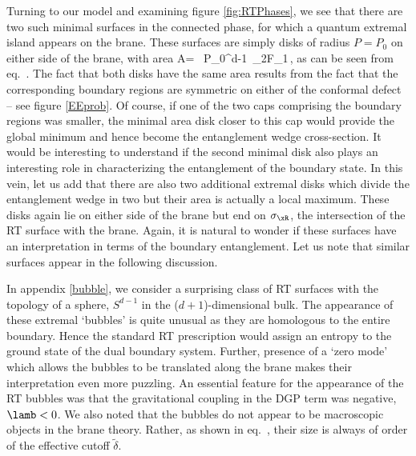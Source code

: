 Turning to our model and examining figure \ref{fig:RTPhases}, we see that there are two such minimal surfaces in the connected phase, for which a quantum extremal island appears on the brane. These surfaces are simply disks of radius $P=P_0$ on either side of the brane, with area
\beq\label{reflw}
A= \ P_0^{d-1}\, {}_{2}F_1\,,
\eeq
as can be seen from eq.~. The fact that both disks have the same area results from the fact that the corresponding boundary regions are symmetric on either of the conformal defect -- see figure \ref{EEprob}. Of course, if one of the two caps comprising the boundary regions was smaller, the minimal area disk closer to this cap would provide the global minimum and hence become the entanglement wedge cross-section. It would be interesting to understand if the second minimal disk also plays an interesting role in characterizing the entanglement of the boundary state. In this vein, let us add that there are also two additional extremal disks which divide the entanglement wedge in two but their area is actually a local maximum. These disks again lie on either side of the brane but end on $\sigma_\xR$, the intersection of the RT surface with the brane. Again, it is natural to wonder if these surfaces have an interpretation in terms of the boundary entanglement. Let us note that similar surfaces appear in the following discussion.\\


	In appendix \ref{bubble}, we consider a surprising class of RT surfaces with the topology of a sphere, \ie $S^{d-1}$ in the ($d+1$)-dimensional bulk. The appearance of these extremal `bubbles' is quite unusual as they are homologous to the entire boundary. Hence the standard RT prescription would assign an entropy to the ground state of the dual boundary system. Further, presence of a `zero mode' which allows the bubbles to be translated along the brane makes their interpretation even more puzzling. An essential feature for the appearance of the RT bubbles was that the gravitational coupling in the DGP term  was negative, \ie $\lamb<0$. We also noted that the bubbles do not appear to be macroscopic objects in the brane theory. Rather, as shown in eq.~, their size is always of order of the effective cutoff $\tilde\delta$.
	
